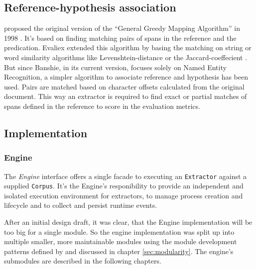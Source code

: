 \subsection{Reference-hypothesis association}
\label{sec:association}
\citeauthor{Douthat:1998} proposed the original version of the \enquote{General Greedy Mapping Algorithm} in 1998 \cite{Douthat:1998}. It's based on finding matching pairs of spans in the reference and the predication. Evaliex extended this algorithm by basing the matching on string or word similarity algorithms like Levenshtein-distance or the Jaccard-coeffecient \cite{Linsmayr:2010}. But since Banshie, in its current version, focuses solely on Named Entity Recognition, a simpler algorithm to associate reference and hypothesis has been used. Pairs are matched based on character offsets calculated from the original document. This way an extractor is required to find exact or partial matches of spans defined in the reference to score in the evaluation metrics.

\subsection{Implementation}
\label{sec:implementation}

\subsubsection{Engine}
The \textit{Engine} interface offers a single facade to executing an \texttt{Extractor} against a supplied \texttt{Corpus}. It's the Engine's responibility to provide an independent and isolated execution environment for extractors, to manage process creation and lifecycle and to collect and persist runtime events.

After an initial design draft, it was clear, that the Engine implementation will be too big for a single module. So the engine implementation was split up into multiple smaller, more maintainable modules using the module development patterns defined by \citeauthor{Knoernschild:2012}\cite{Knoernschild:2012} and discussed in chapter \ref{sec:modularity}. The engine's submodules are described in the following chapters.

